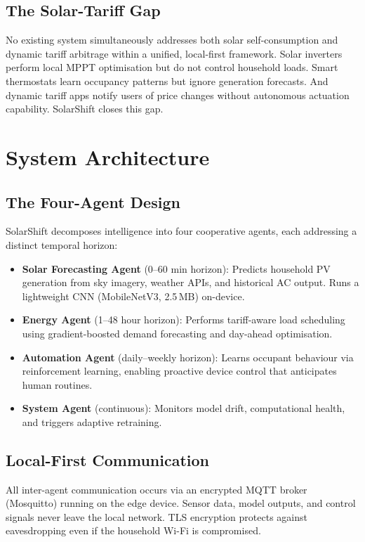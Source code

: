 \documentclass[11pt,a4paper]{article}
\begin{document}
\subsection{The Solar-Tariff Gap}

No existing system simultaneously addresses both solar self-consumption and dynamic tariff arbitrage within a unified, local-first framework. Solar inverters perform local MPPT optimisation but do not control household loads. Smart thermostats learn occupancy patterns but ignore generation forecasts. And dynamic tariff apps notify users of price changes without autonomous actuation capability. SolarShift closes this gap.

\section{System Architecture}
\label{sec:architecture}

\subsection{The Four-Agent Design}

SolarShift decomposes intelligence into four cooperative agents, each addressing a distinct temporal horizon:

\begin{itemize}
    \item \textbf{Solar Forecasting Agent} (0--60 min horizon): Predicts household PV generation from sky imagery, weather APIs, and historical AC output. Runs a lightweight CNN (MobileNetV3, 2.5\,MB) on-device.
    \item \textbf{Energy Agent} (1--48 hour horizon): Performs tariff-aware load scheduling using gradient-boosted demand forecasting and day-ahead optimisation.
    \item \textbf{Automation Agent} (daily--weekly horizon): Learns occupant behaviour via reinforcement learning, enabling proactive device control that anticipates human routines.
    \item \textbf{System Agent} (continuous): Monitors model drift, computational health, and triggers adaptive retraining.
\end{itemize}

\subsection{Local-First Communication}

All inter-agent communication occurs via an encrypted MQTT broker (Mosquitto) running on the edge device. Sensor data, model outputs, and control signals never leave the local network. TLS encryption protects against eavesdropping even if the household Wi-Fi is compromised.
\end{document}
